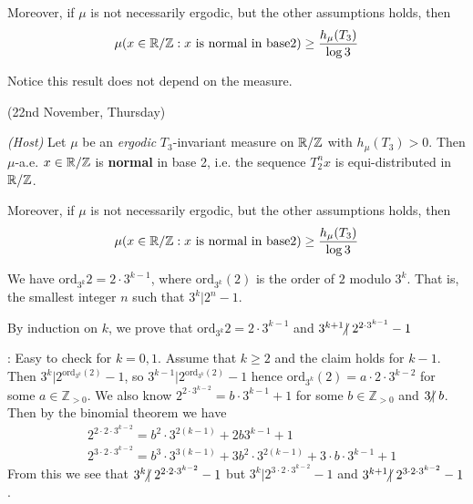 \documentclass[12pt,a4paper]{report}
\newenvironment{proof}
{\begin{changemargin}{1cm}{0.5cm} 
	}%
	{\end{changemargin}
}
\newenvironment{subproof}
{\begin{changemargin}{0.5cm}{0.5cm}
	}%
	{\end{changemargin}
}
\begin{document}
\quad Moreover, if $\mu$ is not necessarily ergodic, but the other assumptions holds, then
\begin{align*}
\mu (x\in \mathbb{R}/\mathbb{Z} : x \text{ is normal in base} 2) \geq \frac{h_{\mu}(T_3)}{\log 3}
\end{align*}

Notice this result does not depend on the measure.
\s

\newday

(22nd November, Thursday)
\s

\thm \emph{(Host)} Let $\mu$ be an \emph{ergodic} $T_3$-invariant measure on $\mathbb{R}/\mathbb{Z}$ with $h_{\mu}(T_3)>0$. Then $\mu$-a.e. $x\in \mathbb{R}/\mathbb{Z}$ is \textbf{normal} in base 2, i.e. the sequence $T_2^n x$ is equi-distributed in $\mathbb{R}/ \mathbb{Z}$.

\quad Moreover, if $\mu$ is not necessarily ergodic, but the other assumptions holds, then
\begin{align*}
\mu (x\in \mathbb{R}/\mathbb{Z} : x \text{ is normal in base} 2) \geq \frac{h_{\mu}(T_3)}{\log 3}
\end{align*}
\s

\lem We have $\text{ord}_{3^k}{2} = 2 \cdot 3^{k-1}$, where $\text{ord}_{3^k}(2)$ is the order of $2$ modulo $3^k$. That is, the smallest integer $n$ such that $3^k | 2^n -1$.
\begin{proof}
\pf By induction on $k$, we prove that $\text{ord}_{3^k} 2= 2\cdot 3^{k-1}$ and $3^{k+1} \hspace{-5pt}\not|\hspace{3pt} 2^{2\cdot 3^{k-1}} -1$
\begin{subproof}
: Easy to check for $k=0,1$. Assume that $k\geq 2$ and the claim holds for $k-1$. Then $3^k | 2^{\text{ord}_{3^k}(2)} -1$, so $3^{k-1} | 2^{\text{ord}_{3^k}(2)}-1$ hence $\text{ord}_{3^k}(2)=a\cdot 2\cdot 3^{k-2}$ for some $a\in \mathbb{Z}_{>0}$. We also know $2^{2\cdot 3^{k-2}} = b\cdot 3^{k-1} +1$ for some $b\in \mathbb{Z}_{>0}$ and $3\hspace{-5pt}\not|\hspace{3pt} b$. Then by the binomial theorem we have
\begin{align*}
& 2^{2\cdot 2\cdot 3^{k-2}} = b^2 \cdot 3^{2(k-1)} + 2b3^{k-1} +1 \\
& 2^{3\cdot 2\cdot 3^{k-2}} = b^3 \cdot 3^{3(k-1)} + 3b^2\cdot 3^{2(k-1)} + 3\cdot b\cdot 3^{k-1} +1
\end{align*}
From this we see that $3^k \hspace{-5pt}\not|\hspace{3pt} 2^{2\cdot 2 \cdot 3^{k-2}} -1$ but $3^k | 2^{3\cdot 2\cdot 3^{k-2}} -1$ and $3^{k+1} \hspace{-5pt}\not|\hspace{3pt} 2^{3\cdot 2\cdot 3^{k-2}} -1$.
\end{subproof}

\eop
\end{proof}
\s
\end{document}
